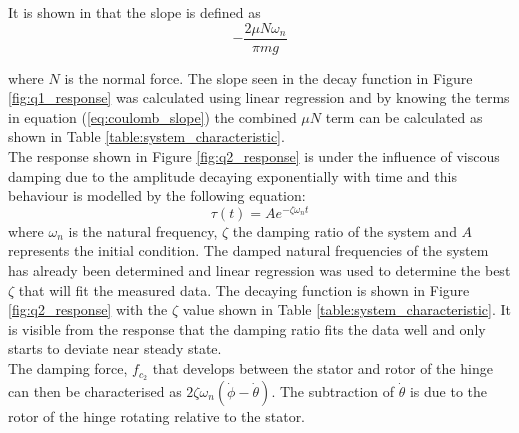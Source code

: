 It is shown in \citet{coulomb_friction} that the slope is defined as 
\begin{equation} \label{eq:coulomb_slope}
-\frac{2\mu N \omega_{n}}{\pi mg}
\end{equation}

where $N$  is the normal force. The slope seen in the decay function in Figure \ref{fig:q1_response} was calculated using linear regression and by knowing the terms in equation (\ref{eq:coulomb_slope}) the combined $\mu N$ term can be calculated as shown in Table \ref{table:system_characteristic}.\\

The response shown in Figure \ref{fig:q2_response} is under the influence of viscous damping due to the amplitude decaying exponentially with time and this behaviour is modelled by the following equation: $$\tau(t) = Ae^{-\zeta \omega_{n}t}$$ where $\omega_{n}$ is the natural frequency, $\zeta$ the damping ratio of the system and $A$ represents the initial condition. The damped natural frequencies of the system has already been determined and linear regression was used to determine the best $\zeta$ that will fit the measured data. The decaying function is shown in Figure \ref{fig:q2_response} with the $\zeta$ value shown in Table \ref{table:system_characteristic}. It is visible from the response that the damping ratio fits the data well and only starts to deviate near steady state.\\

The damping force, $f_{c_{2}}$ that develops between the stator and rotor of the hinge can then be characterised as $2\zeta\omega_{n}(\dot{\phi}-\dot{\theta})$. The subtraction of $\dot{\theta}$ is due to the rotor of the hinge rotating relative to the stator.

